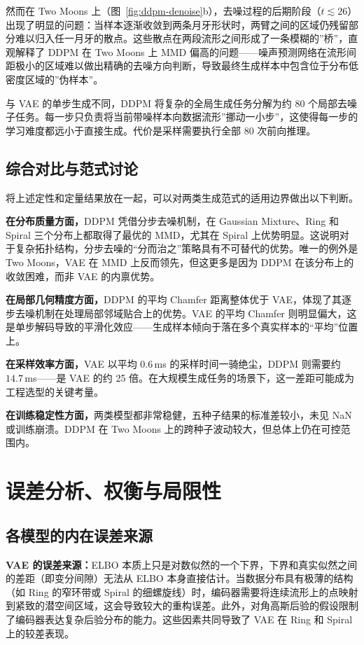 \documentclass[UTF8,a4paper,12pt]{ctexart}
\begin{document}
然而在 Two Moons 上（图~\ref{fig:ddpm-denoise}b），去噪过程的后期阶段（$t \lesssim 26$）出现了明显的问题：当样本逐渐收敛到两条月牙形状时，两臂之间的区域仍残留部分难以归入任一月牙的散点。这些散点在两段流形之间形成了一条模糊的”桥”，直观解释了 DDPM 在 Two Moons 上 MMD 偏高的问题——噪声预测网络在流形间距极小的区域难以做出精确的去噪方向判断，导致最终生成样本中包含位于分布低密度区域的”伪样本”。

与 VAE 的单步生成不同，DDPM 将复杂的全局生成任务分解为约 80 个局部去噪子任务。每一步只负责将当前带噪样本向数据流形”挪动一小步”，这使得每一步的学习难度都远小于直接生成。代价是采样需要执行全部 80 次前向推理。

\subsection{综合对比与范式讨论}

将上述定性和定量结果放在一起，可以对两类生成范式的适用边界做出以下判断。

\textbf{在分布质量方面，}DDPM 凭借分步去噪机制，在 Gaussian Mixture、Ring 和 Spiral 三个分布上都取得了最优的 MMD，尤其在 Spiral 上优势明显。这说明对于复杂拓扑结构，分步去噪的“分而治之”策略具有不可替代的优势。唯一的例外是 Two Moons，VAE 在 MMD 上反而领先，但这更多是因为 DDPM 在该分布上的收敛困难，而非 VAE 的内禀优势。

\textbf{在局部几何精度方面，}DDPM 的平均 Chamfer 距离整体优于 VAE，体现了其逐步去噪机制在处理局部邻域贴合上的优势。VAE 的平均 Chamfer 则明显偏大，这是单步解码导致的平滑化效应——生成样本倾向于落在多个真实样本的“平均”位置上。

\textbf{在采样效率方面，}VAE 以平均 $0.6$\,ms 的采样时间一骑绝尘，DDPM 则需要约 $14.7$\,ms——是 VAE 的约 25 倍。在大规模生成任务的场景下，这一差距可能成为工程选型的关键考量。

\textbf{在训练稳定性方面，}两类模型都非常稳健，五种子结果的标准差较小，未见 NaN 或训练崩溃。DDPM 在 Two Moons 上的跨种子波动较大，但总体上仍在可控范围内。

\section{误差分析、权衡与局限性}

\subsection{各模型的内在误差来源}

\textbf{VAE 的误差来源：}ELBO 本质上只是对数似然的一个下界，下界和真实似然之间的差距（即变分间隙）无法从 ELBO 本身直接估计。当数据分布具有极薄的结构（如 Ring 的窄环带或 Spiral 的细螺旋线）时，编码器需要将连续流形上的点映射到紧致的潜空间区域，这会导致较大的重构误差。此外，对角高斯后验的假设限制了编码器表达复杂后验分布的能力。这些因素共同导致了 VAE 在 Ring 和 Spiral 上的较差表现。
\end{document}
